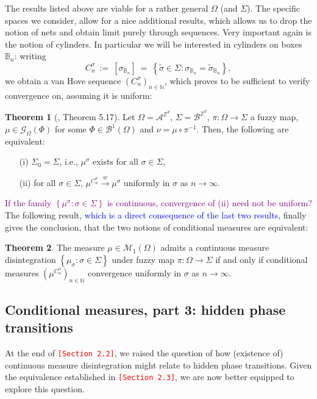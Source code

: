 \documentclass[12pt]{article}
\newcommand{\A}{\mathcal{A}}
\newcommand{\B}{\mathcal{B}}
\newcommand{\BB}{\mathscr{B}}
\newcommand{\BBB}{\mathbb{B}}
\newcommand{\G}{\mathcal{G}}
\newcommand{\M}{\mathcal{M}}
\newcommand{\N}{\mathbb{N}}
\newcommand{\Z}{\mathbb{Z}}
\newcommand{\set}[1]{\left\{#1\right\}}
\newcommand{\ra}{\rightarrow}
\newcommand{\1}{\mathbbm{1}}
\newcommand{\5}{\vspace{0.5cm}}
\renewcommand{\tilde}{\widetilde}
\theoremstyle{definition}
\newtheorem{thm}{Theorem}[section]
\begin{document}
The results listed above are viable for a rather general $\Omega$ (and $\Sigma$). The specific spaces we consider, allow for a nice additional results, which allows us to drop the notion of nets and obtain limit purely through sequences. Very important again is the notion of cylinders. In particular we will be interested in cylinders on boxes $\BBB_n$: writing
$$C_n^\sigma ~:=~ [\sigma_{\BBB_n}] ~=~ \set{\tilde{\sigma}\in\Sigma:\sigma_{\BBB_n}=\tilde{\sigma}_{\BBB_n}},$$
we obtain a van Hove sequence $(C_n^\sigma)_{n\in\N}$, which proves to be sufficient to verify convergence on, assuming it is uniform:
\begin{thm}[\cite{Ber}, Theorem 5.17]
Let $\Omega=\A^{\Z^d}$, $\Sigma=\B^{\Z^d}$, $\pi:\Omega\ra\Sigma$ a fuzzy map, $\mu\in\G_\Omega(\Phi)$ for some $\Phi\in\BB^1(\Omega)$ and $\nu=\mu\circ\pi^{-1}$. Then, the following are equivalent:
\begin{itemize}
	\item[(i)] $\Sigma_0=\Sigma$, i.e., $\mu^\sigma$ exists for all $\sigma\in\Sigma$,
	\item[(ii)] for all $\sigma\in\Sigma$, $\mu^{C_n^\sigma}\xrightarrow{w}\mu^\sigma$ uniformly in $\sigma$ as $n\ra\infty$.
\end{itemize}
\end{thm}

\textcolor{purple}{If the family $\set{\mu^\sigma:\sigma\in\Sigma}$ is continuous, convergence of (ii) need not be uniform?} \\

The following result, \textcolor{blue}{which is a direct consequence of the last two results,} finally gives the conclusion, that the two notions of conditional measures are equivalent:
\begin{thm}
The measure $\mu\in\M_1(\Omega)$ admits a continuous measure disintegration $\set{\mu_\sigma:\sigma\in\Sigma}$ under fuzzy map $\pi:\Omega\ra\Sigma$ if and only if conditional measures $(\mu^{C_n^\sigma})_{n\in\N}$ convergence uniformly in $\sigma$ as $n\ra\infty$.
\end{thm}


\subsection{Conditional measures, part 3: hidden phase transitions}

At the end of \textcolor{red}{\texttt{[Section 2.2]}}, we raised the question of how (existence of) continuous measure disintegration might relate to hidden phase transitions. Given the equivalence established in \textcolor{red}{\texttt{[Section 2.3]}}, we are now better equipped to explore this question. \\
\end{document}
